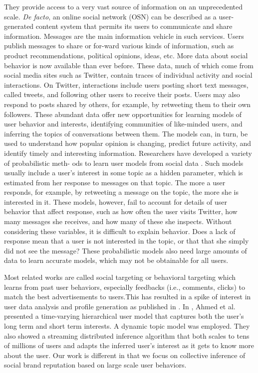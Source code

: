 \documentclass[twocolumn]{svjour3}          %
\begin{document}
They provide access to a very vast source of information on an unprecedented scale. \textit{De facto}, an online social network (OSN) can be described as a user-generated content system that permits its users to communicate and share information.
Messages are the main information vehicle in such services. Users publish messages to share or for-ward various kinds of information, such as product recommendations, political opinions, ideas, etc.
More data about social behavior is now available than ever
before. These data, much of which come from social media sites such as Twitter, contain traces of individual activity and social interactions. On Twitter, interactions include users posting short text messages, called tweets, and following other users to receive their posts. Users may also respond to posts shared by others, for example, by retweeting them to their own followers. These abundant data offer new opportunities for learning models of user behavior and interests, identifying communities of like-minded users, and inferring the topics of conversations between them. The models can, in turn, be used to understand how popular opinion is changing, predict future activity, and identify timely and interesting information.
Researchers have developed a variety of probabilistic meth-
ods to learn user models from social data \cite{chua2013generative,kang2013lda,wang2011collaborative,purushotham2012collaborative}.
Such models usually include a user’s interest in some topic as a hidden parameter, which is estimated from her response to messages on that topic. The more a user responds, for example, by retweeting a message on the topic, the more she is interested in it. These models, however, fail to account for details of user behavior that affect response, such as how often the user visits Twitter, how many messages she receives, and how many of these she inspects. Without considering these variables, it is difficult to explain behavior. Does a lack of response mean that a user is not interested in the topic, or that that she simply did not see the message? These probabilistic models also need large amounts of data to learn accurate models, which may not be obtainable for all users.

Most related works are called social targeting or behavioral targeting which learns from past user behaviors, especially feedbacks (i.e., comments, clicks) to match the best advertisements to users.This has resulted in a spike of interest in user data analysis and profile generation as published in \cite{chen2009large,kumar2010characterization}. In \cite{ahmed2011scalable}, Ahmed et al. presented a time-varying hierarchical user model that captures both the user’s long term and short term interests. A dynamic topic model was employed. They also showed a streaming distributed inference algorithm that both scales to tens of millions of users and adapts the inferred user’s interest as it gets to know more about the user. Our work is different in that we focus on collective inference of social brand reputation based on large scale user behaviors.\cite{zhang2013probabilistic}
\end{document}
